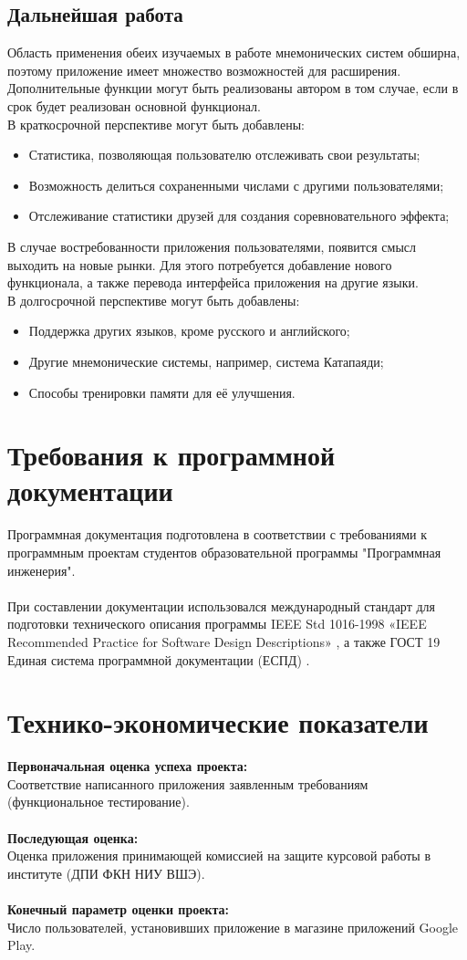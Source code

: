 \documentclass[draft]{article}
\begin{document}
\subsection{Дальнейшая работа}
Область применения обеих изучаемых в работе мнемонических систем обширна, поэтому приложение имеет множество возможностей для расширения. Дополнительные функции могут быть реализованы автором в том случае, если в срок будет реализован основной функционал.\\
В краткосрочной перспективе могут быть добавлены:
\begin{itemize}
\item Статистика, позволяющая пользователю отслеживать свои результаты;
\item Возможность делиться сохраненными числами с другими пользователями;
\item Отслеживание статистики друзей для создания соревновательного эффекта;
\end{itemize}
В случае востребованности приложения пользователями, появится смысл выходить на новые рынки. Для этого потребуется добавление нового функционала, а также перевода интерфейса приложения на другие языки.\\
В долгосрочной перспективе могут быть добавлены: 
\begin{itemize}
\item Поддержка других языков, кроме русского и английского;
\item Другие мнемонические системы, например, система Катапаяди;
\item Способы тренировки памяти для её улучшения.
\end{itemize}
\newpage
\section {Требования к программной документации}
Программная документация подготовлена в соответствии с требованиями к программным проектам студентов образовательной программы "{}Программная инженерия"{}.\\
~\\
При составлении документации использовался международный стандарт для подготовки технического описания программы IEEE Std 1016-1998 «IEEE Recommended Practice for Software Design Descriptions» \cite{litlink12}, а также ГОСТ 19 Единая система программной документации (ЕСПД) \cite{litlink13}.
\newpage
\section {Технико-экономические показатели}
\textbf{Первоначальная оценка успеха проекта:}\\
Соответствие написанного приложения заявленным требованиям (функциональное тестирование).\\
~\\
\textbf{Последующая оценка:}\\
Оценка приложения принимающей комиссией на защите курсовой работы в институте (ДПИ ФКН НИУ ВШЭ).\\
~\\
\textbf{Конечный параметр оценки проекта:}\\
Число пользователей, установивших приложение в магазине приложений Google Play.\\
\newpage
\end{document}
